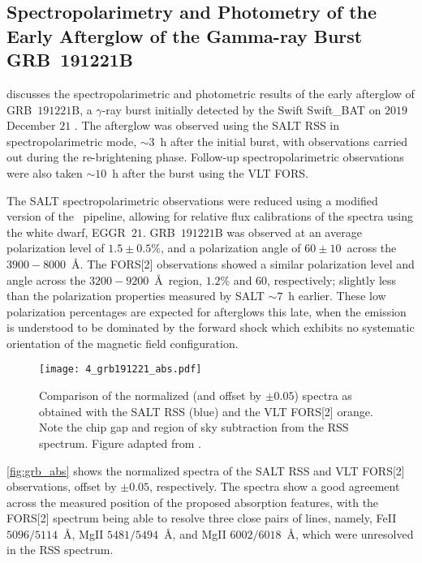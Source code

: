 

\subsection[Buckley et al.\ (2019)]{%
    Spectropolarimetry and Photometry of the Early Afterglow of the Gamma-ray Burst GRB~191221B\\
    \citep{Buckley191221B}
}

\citet{Buckley191221B} discusses the spectropolarimetric and photometric results of the early afterglow of GRB~$191221$B, a $\gamma$-ray burst initially detected by the \gls{Swift} \gls{Swift_BAT} \citep{swift_bat} on $2019$ December $21$ \citep{grb191221b}.
The afterglow was observed using the \gls{SALT} \gls{RSS} in spectropolarimetric mode, $\sim 3$~h after the initial burst, with observations carried out during the re-brightening phase.
Follow-up spectropolarimetric observations were also taken $\sim 10$~h after the burst using the \gls{VLT} \gls{FORS}.

The \gls{SALT} spectropolarimetric observations were reduced using a modified version of the \polsalt\ pipeline, allowing for relative flux calibrations of the spectra using the white dwarf, EGGR~$21$.
GRB~$191221$B was observed at an average polarization level of $1.5 \pm 0.5\%$, and a polarization angle of $60 \pm 10$\degree\ across the $3900 - 8000$~\AA.
The \gls{FORS}[2] observations showed a similar polarization level and angle across the $3200 - 9200$~\AA\ region, $1.2\%$ and $60$\degree, respectively; slightly less than the polarization properties measured by \gls{SALT} $\sim 7$~h earlier.
These low polarization percentages are expected for afterglows this late, when the emission is understood to be dominated by the forward shock which exhibits no systematic orientation of the magnetic field configuration.

\begin{figure}[t]
    \centering
    \texttt{[image: 4\_grb191221\_abs.pdf]}
    \caption{Comparison of the normalized (and offset by $\pm 0.05$) spectra as obtained with the \gls{SALT} \gls{RSS} (blue) and the \gls{VLT} \gls{FORS}[2] orange. Note the chip gap and region of sky subtraction from the \gls{RSS} spectrum. Figure adapted from \citep{Buckley191221B}.}
    \label{fig:grb_abs}
\end{figure}

\autoref{fig:grb_abs} shows the normalized spectra of the \gls{SALT} \gls{RSS} and \gls{VLT} \gls{FORS}[2] observations, offset by $\pm 0.05$, respectively.
The spectra show a good agreement across the measured position of the proposed absorption features, with the \gls{FORS}[2] spectrum being able to resolve three close pairs of lines, namely, {Fe}{II} $5096/5114$~\AA, {Mg}{II} $5481/5494$~\AA, and {Mg}{II} $6002/6018$~\AA, which were unresolved in the \gls{RSS} spectrum.


